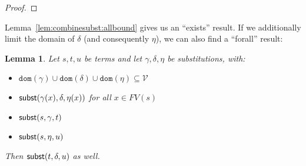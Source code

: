 \documentclass{lmcs}
\theoremstyle{theorem}\newtheorem{theorem}{Theorem}
\theoremstyle{theorem}\newtheorem{lemma}[theorem]{Lemma}
\theoremstyle{theorem}\newtheorem{corollary}[theorem]{Corollary}
\theoremstyle{definition}\newtheorem{definition}[theorem]{Definition}
\theoremstyle{definition}\newtheorem{example}[theorem]{Example}
\newcommand{\V}{\mathcal{V}}
\newcommand{\M}{\mathcal{M}}
\newcommand{\FV}{\mathit{FV}}
\newcommand{\domain}{\mathtt{dom}}
\newcommand{\avar}{x}
\newcommand{\Avar}{X}
\newcommand{\abs}[2]{\lambda #1.#2}
\newcommand{\meta}[2]{#1\langle#2\rangle}
\begin{document}
\begin{proof}
\end{proof}

Lemma~\ref{lem:combinesubst:allbound} gives us an ``exists'' result.  If we
additionally limit the domain of $\delta$ (and consequently $\eta$), we can also
find a ``forall'' result:

\begin{lemma}\label{lem:combinesubst:gammadeltalimited}
Let $s,t,u$ be terms and let $\gamma,\delta,\eta$ be substitutions, with:
\begin{itemize}
\item $\domain(\gamma) \cup \domain(\delta) \cup \domain(\eta) \subseteq \V$
\item $\subrel{\gamma(\avar),\delta,\eta(\avar)}$ for all $\avar \in \FV(s)$
\item $\mathsf{subst}(s,\gamma,t)$
\item $\mathsf{subst}(s,\eta,u)$
\end{itemize}
Then $\mathsf{subst}(t,\delta,u)$ as well.
\end{lemma}
\end{document}
